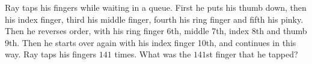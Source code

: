 Ray taps his fingers while waiting in a queue. First he puts his thumb down, then his index finger, third his middle finger, fourth his ring finger and fifth his pinky. Then he reverses order, with his ring finger 6th, middle 7th, index 8th and thumb 9th. Then he starts over again with his index finger 10th, and continues in this way. Ray taps his fingers $141$ times. What was the $141$st finger that he tapped?

